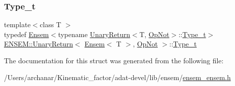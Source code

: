 \mbox{\label{structENSEM_1_1UnaryReturn_3_01Ensem_3_01T_01_4_00_01OpNot_01_4_a858a31d9b2f5ae17601e7f83f0a58f5a}} 
\subsubsection{\texorpdfstring{Type\_t}{Type\_t}\hspace{0.1cm}{\footnotesize\ttfamily [3/3]}}
{\footnotesize\ttfamily template$<$class T $>$ \\
typedef \mbox{\hyperlink{classENSEM_1_1Ensem}{Ensem}}$<$typename \mbox{\hyperlink{structENSEM_1_1UnaryReturn}{Unary\+Return}}$<$T, \mbox{\hyperlink{structENSEM_1_1OpNot}{Op\+Not}}$>$\+::\mbox{\hyperlink{structENSEM_1_1UnaryReturn_3_01Ensem_3_01T_01_4_00_01OpNot_01_4_a858a31d9b2f5ae17601e7f83f0a58f5a}{Type\+\_\+t}}$>$ \mbox{\hyperlink{structENSEM_1_1UnaryReturn}{E\+N\+S\+E\+M\+::\+Unary\+Return}}$<$ \mbox{\hyperlink{classENSEM_1_1Ensem}{Ensem}}$<$ T $>$, \mbox{\hyperlink{structENSEM_1_1OpNot}{Op\+Not}} $>$\+::\mbox{\hyperlink{structENSEM_1_1UnaryReturn_3_01Ensem_3_01T_01_4_00_01OpNot_01_4_a858a31d9b2f5ae17601e7f83f0a58f5a}{Type\+\_\+t}}}



The documentation for this struct was generated from the following file\+:\begin{DoxyCompactItemize}
\item 
/\+Users/archanar/\+Kinematic\+\_\+factor/adat-\/devel/lib/ensem/\mbox{\hyperlink{adat-devel_2lib_2ensem_2ensem__ensem_8h}{ensem\+\_\+ensem.\+h}}\end{DoxyCompactItemize}
